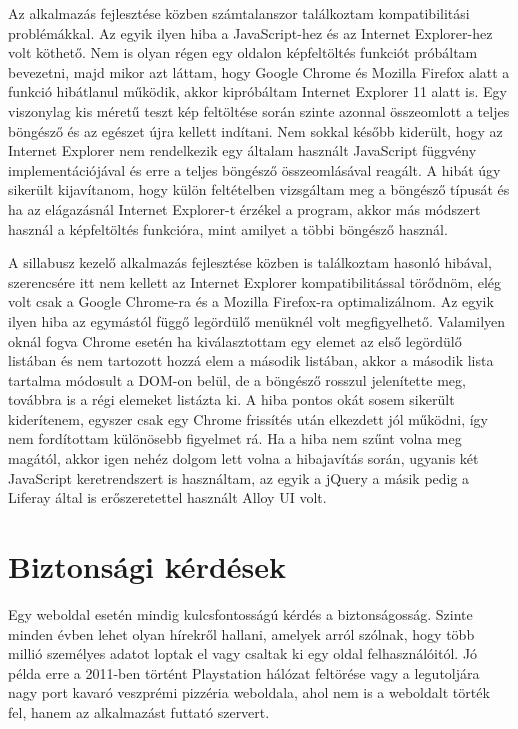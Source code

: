 \documentclass[hidelinks, 12pt, a4paper]{report}
\begin{document}
Az alkalmazás fejlesztése közben számtalanszor találkoztam kompatibilitási problémákkal. Az egyik ilyen hiba a JavaScript-hez és az Internet Explorer-hez volt köthető. Nem is olyan régen egy oldalon képfeltöltés funkciót próbáltam bevezetni, majd mikor azt láttam, hogy Google Chrome és Mozilla Firefox alatt a funkció hibátlanul működik, akkor kipróbáltam Internet Explorer 11 alatt is. Egy viszonylag kis méretű teszt kép feltöltése során szinte azonnal összeomlott a teljes böngésző és az egészet újra kellett indítani. Nem sokkal később kiderült, hogy az Internet Explorer nem rendelkezik egy általam használt JavaScript függvény implementációjával és erre a teljes böngésző összeomlásával reagált. A hibát úgy sikerült kijavítanom, hogy külön feltételben vizsgáltam meg a böngésző típusát és ha az elágazásnál Internet Explorer-t érzékel a program, akkor más módszert használ a képfeltöltés funkcióra, mint amilyet a többi böngésző használ.

A sillabusz kezelő alkalmazás fejlesztése közben is találkoztam hasonló hibával, szerencsére itt nem kellett az Internet Explorer kompatibilitással törődnöm, elég volt csak a Google Chrome-ra és a Mozilla Firefox-ra optimalizálnom. Az egyik ilyen hiba az egymástól függő legördülő menüknél volt megfigyelhető. Valamilyen oknál fogva Chrome esetén ha kiválasztottam egy elemet az első legördülő listában és nem tartozott hozzá elem a második listában, akkor a második lista tartalma módosult a DOM-on belül, de a böngésző rosszul jelenítette meg, továbbra is a régi elemeket listázta ki. A hiba pontos okát sosem sikerült kiderítenem, egyszer csak egy Chrome frissítés után elkezdett jól működni, így nem fordítottam különösebb figyelmet rá. Ha a hiba nem szűnt volna meg magától, akkor igen nehéz dolgom lett volna a hibajavítás során, ugyanis két JavaScript keretrendszert is használtam, az egyik a jQuery a másik pedig a Liferay által is erőszeretettel használt Alloy UI volt.

\section{Biztonsági kérdések}

Egy weboldal esetén mindig kulcsfontosságú kérdés a biztonságosság. Szinte minden évben lehet olyan hírekről hallani, amelyek arról szólnak, hogy több millió személyes adatot loptak el vagy csaltak ki egy oldal felhasználóitól. Jó példa erre a 2011-ben történt Playstation hálózat feltörése vagy a legutoljára nagy port kavaró veszprémi pizzéria weboldala, ahol nem is a weboldalt törték fel, hanem az alkalmazást futtató szervert.
\end{document}
